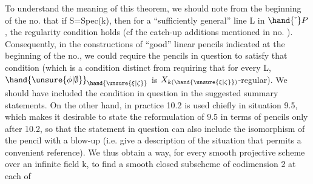  

To understand the meaning of this theorem, we should
note from the beginning of the no. that if S=Spec(k), then for a
“sufficiently general” line L in $\hand{\check{\ }}P$, the regularity condition holds
(cf the catch-up additions mentioned in no. ). Consequently, in the constructions
of “good” linear pencils indicated at the beginning of the no., we could
require the pencils in question  to satisfy that condition
(which  is a condition distinct from requiring
that for every \hand{$\unsure{\xi|\zeta}\in$}L, $\hand{\unsure{\phi|\emptyset}}_{\hand{\unsure{\xi|\zeta}}}$ is $X_{k(\hand{\unsure{\xi|\zeta}})}$-regular). We should have included
the condition in question in the suggested summary statements.
 On the other hand, in practice 10.2 is
used chiefly in situation 9.5, which makes it desirable
to state the reformulation of 9.5 in terms of pencils only after
10.2, so that the statement in question can also include the
isomorphism of the pencil with a blow-up (i.e. give a description of the
situation that permits a convenient reference). We thus obtain a
way, for every smooth projective scheme over an infinite field k, to find
a smooth closed subscheme  of codimension 2 at each of
